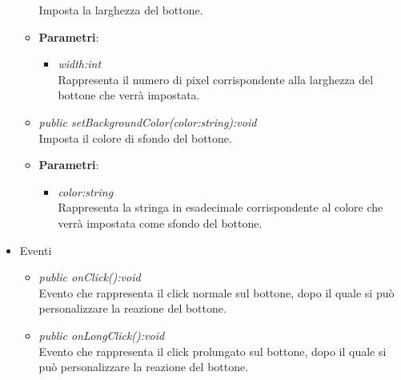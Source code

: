 \begin{itemize}
\begin{itemize}
	Imposta la larghezza del bottone.
		\item{\textbf{Parametri}: \begin{itemize}
		\item \textit{width:int}\\
		Rappresenta il numero di pixel corrispondente alla larghezza del bottone che verrà impostata.
		\end{itemize}}
	\item \textit{public setBackgroundColor(color:string):void}\\
	Imposta il colore di sfondo del bottone.
		\item{\textbf{Parametri}: \begin{itemize}
		\item \textit{color:string}\\
		Rappresenta la stringa in esadecimale corrispondente al colore che verrà impostata come sfondo del bottone.
		\end{itemize}}
	\end{itemize}
\item{Eventi}
	\begin{itemize}
	\item \textit{public onClick():void}\\
	Evento che rappresenta il click normale sul bottone, dopo il quale si può personalizzare la reazione del bottone.
	\item \textit{public onLongClick():void}\\
	Evento che rappresenta il click prolungato sul bottone, dopo il quale si può personalizzare la reazione del bottone.
	\end{itemize}
\end{itemize}

